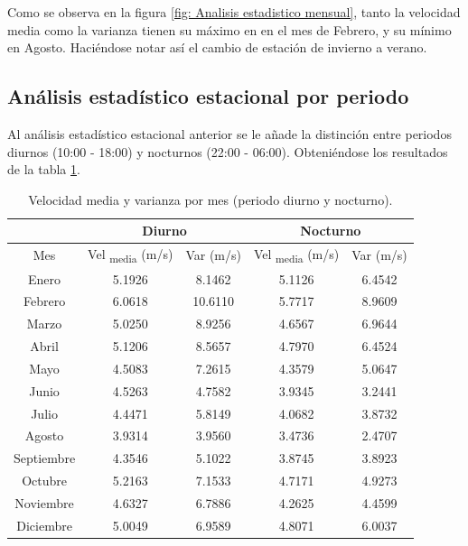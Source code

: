 \documentclass{IEEEtran}
\begin{document}
Como se observa en la figura \ref{fig: Analisis estadistico mensual}, tanto la velocidad media como la varianza tienen su máximo en en el mes de Febrero, y su mínimo en Agosto. Haciéndose notar así el cambio de estación de invierno a verano.

\subsection{Análisis estadístico estacional por periodo}
Al análisis estadístico estacional anterior se le añade la distinción entre periodos diurnos (10:00 - 18:00) y nocturnos (22:00 - 06:00). Obteniéndose los resultados de la tabla \ref{tab: Velocidad media y varianza por mes (periodo diurno y nocturno)}.

\begin{table}[h]
    \centering
    \label{tab: Velocidad media y varianza por mes (periodo diurno y nocturno)}
    \caption{Velocidad media y varianza por mes (periodo diurno y nocturno).}
    \begin{tabular}{|c|c|c|c|c|}
        \hline
        & \multicolumn{2}{|c|}{Diurno} & \multicolumn{2}{c|}{Nocturno} \\
        \hline
        Mes & Vel \textsubscript{media} (m/s) & Var (m/s) & Vel \textsubscript{media} (m/s) & Var (m/s) \\
        \hline
        Enero & 5.1926 & 8.1462 & 5.1126 & 6.4542 \\
        Febrero & 6.0618 & 10.6110 & 5.7717 & 8.9609 \\
        Marzo & 5.0250 & 8.9256 & 4.6567 & 6.9644 \\
        Abril & 5.1206 & 8.5657 & 4.7970 & 6.4524 \\
        Mayo & 4.5083 & 7.2615 & 4.3579 & 5.0647 \\
        Junio & 4.5263 & 4.7582 & 3.9345 & 3.2441 \\
        Julio & 4.4471 & 5.8149 &  4.0682 & 3.8732 \\
        Agosto & 3.9314 & 3.9560 & 3.4736 & 2.4707 \\
        Septiembre & 4.3546 & 5.1022 & 3.8745 & 3.8923 \\
        Octubre & 5.2163 & 7.1533 & 4.7171 & 4.9273 \\
        Noviembre & 4.6327 & 6.7886 & 4.2625 & 4.4599 \\
        Diciembre & 5.0049 & 6.9589 & 4.8071 & 6.0037 \\
        \hline 
    \end{tabular}
\end{table}
\end{document}
